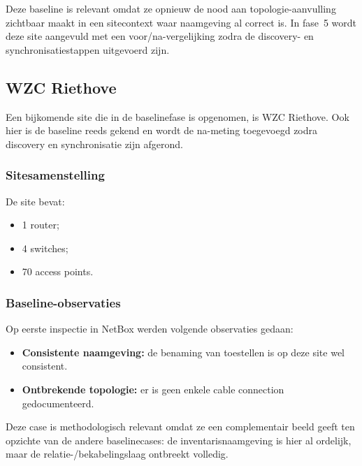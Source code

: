 Deze baseline is relevant omdat ze opnieuw de nood aan topologie-aanvulling zichtbaar maakt in een sitecontext waar naamgeving al correct is. In fase~5 wordt deze site aangevuld met een voor/na-vergelijking zodra de discovery- en synchronisatiestappen uitgevoerd zijn.

\subsection{WZC Riethove}

Een bijkomende site die in de baselinefase is opgenomen, is WZC Riethove. Ook hier is de baseline reeds gekend en wordt de na-meting toegevoegd zodra discovery en synchronisatie zijn afgerond.

\subsubsection{Sitesamenstelling}

De site bevat:
\begin{itemize}
  \item 1 router;
  \item 4 switches;
  \item 70 access points.
\end{itemize}

\subsubsection{Baseline-observaties}

Op eerste inspectie in NetBox werden volgende observaties gedaan:
\begin{itemize}
  \item \textbf{Consistente naamgeving:} de benaming van toestellen is op deze site wel consistent.
  \item \textbf{Ontbrekende topologie:} er is geen enkele cable connection gedocumenteerd.
\end{itemize}

Deze case is methodologisch relevant omdat ze een complementair beeld geeft ten opzichte van de andere baselinecases: de inventarisnaamgeving is hier al ordelijk, maar de relatie-/bekabelingslaag ontbreekt volledig.


